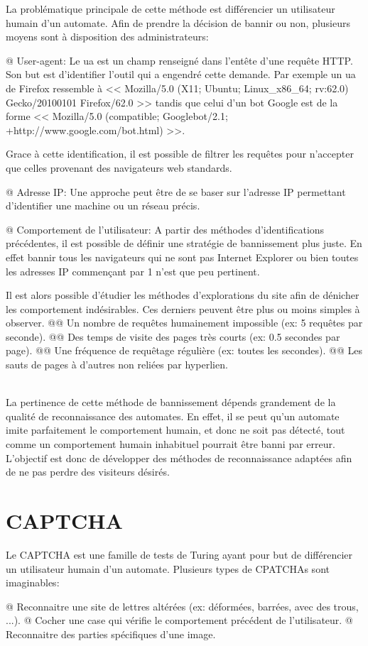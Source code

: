 \documentclass[hideweeklyreports,noposter]{polytech/polytech}
\begin{document}
			La problématique principale de cette méthode est différencier un utilisateur humain d'un automate.
			Afin de prendre la décision de bannir ou non, plusieurs moyens sont à disposition des administrateurs:
			
			\begin{easylist}[itemize]
				@ User-agent: Le \gls{ua} est un champ renseigné dans l'entête d'une requête HTTP.
				Son but est d'identifier l'outil qui a engendré cette demande.
				Par exemple un \gls{ua} de Firefox ressemble à << Mozilla/5.0 (X11; Ubuntu; Linux\_x86\_64; rv:62.0) Gecko/20100101 Firefox/62.0 >> tandis que celui d'un bot Google est de la forme << Mozilla/5.0 (compatible; Googlebot/2.1; +http://www.google.com/bot.html) >>.
				
				Grace à cette identification, il est possible de filtrer les requêtes pour n'accepter que celles provenant des navigateurs web standards.
				
				@ Adresse IP: Une approche peut être de se baser sur l'adresse IP permettant d'identifier une machine ou un réseau précis.
				
				@ Comportement de l'utilisateur: A partir des méthodes d'identifications précédentes, il est possible de définir une stratégie de bannissement plus juste.
				En effet bannir tous les navigateurs qui ne sont pas Internet Explorer ou bien toutes les adresses IP commençant par 1 n'est que peu pertinent.
				
				Il est alors possible d'étudier les méthodes d'explorations du site afin de dénicher les comportement indésirables.
				Ces derniers peuvent être plus ou moins simples à observer.
				@@ Un nombre de requêtes humainement impossible (ex: 5 requêtes par seconde).
				@@ Des temps de visite des pages très courts (ex: 0.5 secondes par page).
				@@ Une fréquence de requêtage régulière (ex: toutes les secondes).
				@@ Les sauts de pages à d'autres non reliées par hyperlien.
			\end{easylist}
			~\\
			
			La pertinence de cette méthode de bannissement dépends grandement de la qualité de reconnaissance des automates.
			En effet, il se peut qu'un automate imite parfaitement le comportement humain, et donc ne soit pas détecté, tout comme un comportement humain inhabituel pourrait être banni par erreur.
			L'objectif est donc de développer des méthodes de reconnaissance adaptées afin de ne pas perdre des visiteurs désirés.
			
		\section{CAPTCHA}
			Le CAPTCHA est une famille de tests de Turing ayant pour but de différencier un utilisateur humain d'un automate.
			Plusieurs types de CPATCHAs sont imaginables:
			\begin{easylist}[itemize]
				@ Reconnaitre une site de lettres altérées (ex: déformées, barrées, avec des trous, ...).
				@ Cocher une case qui vérifie le comportement précédent de l'utilisateur.
				@ Reconnaitre des parties spécifiques d'une image.
			\end{easylist}
			
\end{document}
